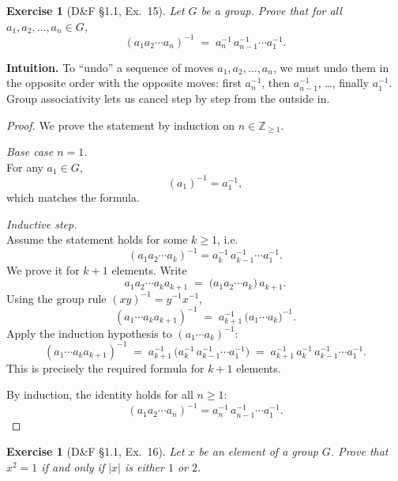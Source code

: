 \documentclass[12pt]{article}
\newtheorem{exercise}[theorem]{Exercise}
\theoremstyle{definition}
\begin{document}
\newpage

\begin{exercise}[D\&F §1.1, Ex.~15]
Let $G$ be a group. Prove that for all $a_1,a_2,\dots,a_n\in G$,
\[
(a_1a_2\cdots a_n)^{-1}\;=\;a_n^{-1}\,a_{n-1}^{-1}\cdots a_1^{-1}.
\]
\end{exercise}

\dotfill

\noindent
\textbf{Intuition.}
To “undo” a sequence of moves $a_1,a_2,\dots,a_n$, we must undo them in the opposite
order with the opposite moves: first $a_n^{-1}$, then $a_{n-1}^{-1}$, …, finally $a_1^{-1}$.
Group associativity lets us cancel step by step from the outside in.

\dotfill

\begin{proof}
We prove the statement by induction on $n\in\mathbb{Z}_{\ge 1}$.

\dotfill

\noindent\emph{Base case $n=1$.}\\

\noindent
For any $a_1\in G$,
\[
(a_1)^{-1}=a_1^{-1},
\]
which matches the formula.

\dotfill

\noindent\emph{Inductive step.}\\

\noindent
Assume the statement holds for some $k\ge 1$, i.e.
\[
(a_1a_2\cdots a_k)^{-1}=a_k^{-1}\,a_{k-1}^{-1}\cdots a_1^{-1}.
\]
We prove it for $k+1$ elements. Write
\[
a_1a_2\cdots a_k a_{k+1} \;=\; \bigl(a_1a_2\cdots a_k\bigr)\,a_{k+1}.
\]
Using the group rule $(xy)^{-1}=y^{-1}x^{-1}$,
\[
(a_1\cdots a_k a_{k+1})^{-1}
\;=\; a_{k+1}^{-1}\,\bigl(a_1\cdots a_k\bigr)^{-1}.
\]
Apply the induction hypothesis to $(a_1\cdots a_k)^{-1}$:
\[
(a_1\cdots a_k a_{k+1})^{-1}
\;=\; a_{k+1}^{-1}\,\bigl(a_k^{-1}\,a_{k-1}^{-1}\cdots a_1^{-1}\bigr)
\;=\; a_{k+1}^{-1}\,a_k^{-1}\,a_{k-1}^{-1}\cdots a_1^{-1}.
\]
This is precisely the required formula for $k+1$ elements.

\dotfill

\noindent
By induction, the identity holds for all $n\ge 1$:
\[
(a_1a_2\cdots a_n)^{-1}=a_n^{-1}\,a_{n-1}^{-1}\cdots a_1^{-1}.
\]
\end{proof}

\newpage

\begin{exercise}[D\&F §1.1, Ex.~16]
Let $x$ be an element of a group $G$. Prove that $x^2=1$ if and only if $|x|$ is either $1$ or $2$.
\end{exercise}
\end{document}
